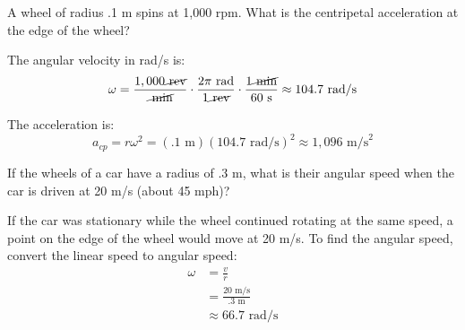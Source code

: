 \documentclass{exam}
\begin{document}
\begin{questions}
\begin{solution}
\end{solution}

\item A wheel of radius .1 m spins at 1,000 rpm.  What is the centripetal acceleration at the edge of the wheel?

\begin{solution}
The angular velocity in rad/s is:
\[
  \omega = \frac{1,000 \cancel{\text{ rev}}}{\cancel{\text{ min}}} 
      \cdot \frac{2 \pi \text{ rad}}{1 \cancel{ \text{ rev}}} \cdot \frac{1 \cancel{\text{ min}}}{60 \text{ s}} 
      \approx 104.7 \text{ rad/s}
\]

The acceleration is:
\[
  a_{cp} = r \omega^2 = (.1 \text{ m})(104.7 \text{ rad/s})^2 \approx 1,096 \text{ m/s}^2
\]

\end{solution}

\item If the wheels of a car have a radius of .3 m, what is their angular speed when the car is driven at 20 m/s (about 45 mph)?

\begin{solution}
If the car was stationary while the wheel continued rotating at the same speed, a point on the edge of the wheel would
move at 20 m/s.  To find the angular speed, convert the linear speed to angular speed:
\begin{align*}
  \omega &= \frac{v}{r} \\
  &= \frac{20 \text{ m/s}}{.3 \text{ m}} \\
  &\approx 66.7 \text{ rad/s} \\ 
\end{align*}


\end{solution}
\end{questions}
\end{document}
